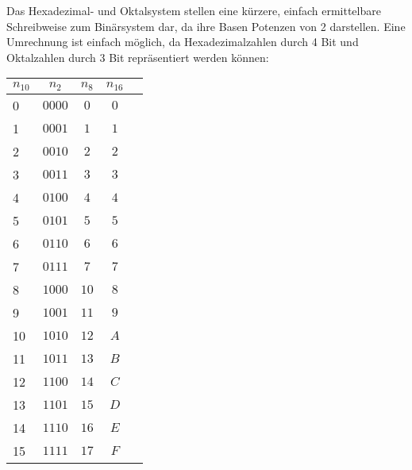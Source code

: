 \begin{bsslide}[\textbufferB]
  \small
  Das Hexadezimal- und Oktalsystem stellen eine k\"urzere, einfach ermittelbare Schreibweise zum Bin\"arsystem dar, da ihre Basen Potenzen von 2 darstellen. Eine Umrechnung ist einfach m\"oglich, da Hexadezimalzahlen durch 4 Bit und Oktalzahlen durch 3 Bit repr\"asentiert werden k\"onnen:
  \begin{center}
    \begin{tabular}{lcccc}
      \textbf{$n_{10}$}   &   \textbf{$n_2$}     & \textbf{$n_{8}$}    & \textbf{$n_{16}$}  \\
      \hline
      0  &      $0000$          &      $0$      &      $0$     \\
      1  &      $0001$          &      $1$      &      $1$     \\
      2  &      $0010$          &      $2$      &      $2$     \\
      3  &      $0011$          &      $3$      &      $3$     \\
      4  &      $0100$          &      $4$      &      $4$     \\
      5  &      $0101$          &      $5$      &      $5$     \\
      6  &      $0110$          &      $6$      &      $6$     \\
      7  &      $0111$          &      $7$      &      $7$     \\
      8  &      $1000$          &      $10$      &      $8$     \\
      9  &      $1001$          &      $11$      &      $9$     \\
      10  &      $1010$          &      $12$      &      $A$     \\
      11  &      $1011$          &      $13$      &      $B$     \\
      12  &      $1100$          &      $14$      &      $C$     \\
      13  &      $1101$          &      $15$      &      $D$     \\
      14  &      $1110$          &      $16$      &      $E$     \\
      15  &      $1111$          &      $17$      &      $F$     \\
      \hline
    \end{tabular}
  \end{center}
\end{bsslide}

